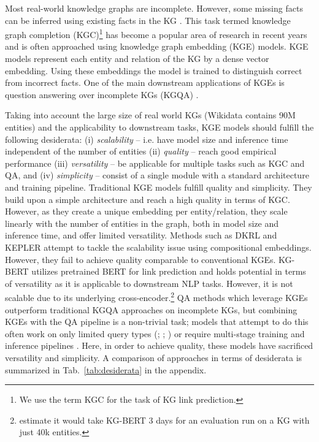 \documentclass[11pt]{article}
\renewcommand\:{\colon} \newcommand{\sset}[1]{\left\{\,#1\,\right\}} \newcommand{\ssets}[1]{\left\{#1\right\}} \newcommand{\ssetn}[1]{\{\,#1\,\}}
\begin{document}
Most real-world knowledge graphs are incomplete.
However, some missing facts can be inferred using existing facts in the KG \cite{bordes2013translating}. 
This task termed knowledge graph completion (KGC)\footnote{We use the term KGC for the task of KG link prediction.} has become a popular area of research in recent years \cite{kge_survey} and is often approached using knowledge graph embedding (KGE) models.
KGE models represent each entity and relation of the KG by a dense vector embedding. 
Using these embeddings the model is trained to distinguish correct from incorrect facts.
One of the main downstream applications of KGEs is question answering over incomplete KGs (KGQA) \cite{kge_application_survey}. 

Taking into account the large size of real world KGs (Wikidata contains 90M entities) and the applicability to downstream tasks, KGE models
should fulfill the following desiderata: 
(i) \emph{scalability} -- i.e. have model size and inference time independent of the number of entities 
(ii) \emph{quality} -- reach good empirical performance
(iii) \emph{versatility} -- be applicable for multiple tasks such as KGC and QA, and 
(iv) \emph{simplicity} -- consist of a single module with a standard architecture and training pipeline.
Traditional KGE models fulfill quality and simplicity. 
They build upon a simple architecture and reach a high quality in terms of KGC.
However, as they create a unique embedding per entity/relation, they scale linearly with the number of entities in the graph, both in model size and inference time, and offer limited versatility.
Methods such as DKRL \cite{Xie_Liu_Jia_Luan_Sun_2016} and KEPLER \cite{wang2021KEPLER} attempt to tackle the scalability issue using compositional embeddings.
However, they fail to achieve quality comparable to conventional KGEs. 
KG-BERT \cite{kg-bert} utilizes pretrained BERT for link prediction and holds potential in terms of versatility as it is applicable to downstream NLP tasks. 
However, it is not scalable due to its underlying cross-encoder.\footnote{
    \citet{time-taken-kgbert} estimate it would take KG-BERT 3 days for an evaluation run on a KG with just 40k entities.
}
QA methods which leverage KGEs outperform traditional KGQA approaches on incomplete KGs, but combining KGEs with the QA pipeline is a non-trivial task;
models that attempt to do this often work on only limited query types (\citealt{huang2019knowledge}; 
\citealt{sun2021faithful}; \citealt{saxena2020improving}) or require multi-stage training and inference pipelines \cite{ren2021lego}.
Here, in order to achieve quality, these models have sacrificed versatility and simplicity.
A comparison of approaches in terms of desiderata is summarized in Tab.~\ref{tab:desiderata} in the appendix.
\end{document}
